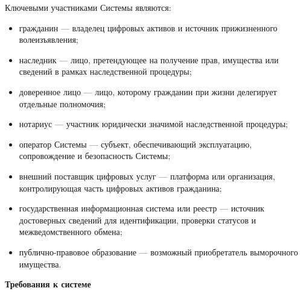 Ключевыми участниками Системы являются:
\begin{itemize}
    \item гражданин --- владелец цифровых активов и источник прижизненного волеизъявления;
    \item наследник --- лицо, претендующее на получение прав, имущества или сведений в рамках наследственной процедуры;
    \item доверенное лицо --- лицо, которому гражданин при жизни делегирует отдельные полномочия;
    \item нотариус --- участник юридически значимой наследственной процедуры;
    \item оператор Системы --- субъект, обеспечивающий эксплуатацию, сопровождение и безопасность Системы;
    \item внешний поставщик цифровых услуг --- платформа или организация, контролирующая часть цифровых активов гражданина;
    \item государственная информационная система или реестр --- источник достоверных сведений для идентификации, проверки статусов и межведомственного обмена;
    \item публично-правовое образование --- возможный приобретатель выморочного имущества.
\end{itemize}

\textbf{Требования к системе}

\singlespacing
\footnotesize
\setlength{\LTpre}{0pt}
\setlength{\LTpost}{0pt}
\setlength{\tabcolsep}{3pt}
\renewcommand{\arraystretch}{1.08}

